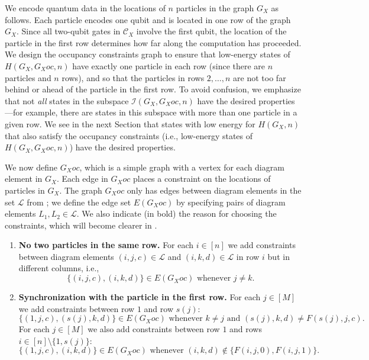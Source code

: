 \documentclass[../thesis-main/thesis-main]{subfiles}
\begin{document}
We encode quantum data in the locations of $n$ particles in the graph $G_X$ as follows. Each particle encodes one qubit and is located in one row of the graph $G_X$. Since all two-qubit gates in $\mathcal{C}_{X}$ involve the first qubit, the location of the particle in the first row determines how far along the computation has proceeded. We design the occupancy constraints graph to ensure that low-energy states of $H(G_X,G_Xoc,n)$ have exactly one particle in each row (since there are $n$ particles and $n$ rows), and so that the particles in rows $2,\ldots,n$ are not too far behind or ahead of the particle in the first row. To avoid confusion, we emphasize that not \emph{all} states in the subspace $\mathcal{I}(G_X,G_Xoc,n)$ have the desired properties---for example, there are states in this subspace with more than one particle in a given row. We see in the next Section that states with low energy for $H(G_X,n)$ that also satisfy the occupancy constraints (i.e., low-energy states of $H(G_X,G_Xoc,n)$) have the desired properties.

We now define $G_Xoc$, which is a simple graph with a vertex for each diagram element in $G_X$. Each edge in $G_Xoc$ places a constraint on the locations of particles in $G_X$. The graph $G_Xoc$ only has edges between diagram elements in the set $\mathcal{L}$ from ; we define the edge set $E(G_Xoc)$ by specifying pairs of diagram elements $L_{1},L_{2}\in\mathcal{L}$. We also indicate (in bold) the reason for choosing the constraints, which will become clearer in .
\begin{enumerate}
\item \textbf{No two particles in the same row.} For each $i\in[n]$ we add constraints between diagram elements $(i,j,c)\in\mathcal{L}$ and $(i,k,d)\in\mathcal{L}$ in row $i$ but in different columns, i.e.,
\begin{equation}
\{\left(i,j,c\right),\left(i,k,d\right)\}\in E(G_Xoc)\text{ whenever }j\neq k.\label{eq:occ_constraints_type1}
\end{equation}
\item \textbf{Synchronization with the particle in the first row.} For each $j\in[M]$ we add constraints between row $1$ and row $s(j)$:
\begin{equation}
\{(1,j,c),(s(j),k,d)\}\in E(G_Xoc)\text{ whenever }k\neq j\text{ and }(s(j),k,d)\neq F(s(j),j,c).
\end{equation}
For each $j\in[M]$ we also add constraints between row $1$ and rows $i\in[n]\setminus\{1,s(j)\}$:
\begin{equation}
\{(1,j,c),(i,k,d)\}\in E(G_Xoc)\text{ whenever }(i,k,d)\notin\{F(i,j,0),F(i,j,1)\}.
\end{equation}
\end{enumerate}
\end{document}
